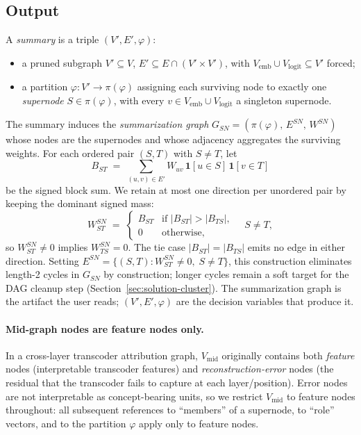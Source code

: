 \subsection{Output}\label{sec:output}

A \emph{summary} is a triple $(V', E', \varphi)$:
\begin{itemize}[leftmargin=*,topsep=2pt,itemsep=1pt]
\item a pruned subgraph $V' \subseteq V$, $E' \subseteq E \cap (V' \times V')$,
with $V_{\text{emb}} \cup V_{\text{logit}} \subseteq V'$ forced;
\item a partition $\varphi : V' \to \pi(\varphi)$ assigning each surviving
node to exactly one \emph{supernode} $S \in \pi(\varphi)$, with every
$v \in V_{\text{emb}} \cup V_{\text{logit}}$ a singleton supernode.
\end{itemize}
The summary induces the \emph{summarization graph}
$G_{SN} = (\pi(\varphi),\, E^{SN},\, W^{SN})$ whose nodes are the
supernodes and whose adjacency aggregates the surviving weights.
For each ordered pair $(S, T)$ with $S \ne T$, let
\begin{equation}
B_{ST} \;=\; \sum_{(u, v) \in E'} W_{uv}\,
\mathbf{1}[u \in S]\,\mathbf{1}[v \in T]
\label{eq:block-sum}
\end{equation}
be the signed block sum. We retain at most one direction per
unordered pair by keeping the dominant signed mass:
\begin{equation}
W^{SN}_{ST} \;=\;
\begin{cases}
B_{ST} & \text{if } |B_{ST}| > |B_{TS}|, \\
0      & \text{otherwise},
\end{cases}
\quad S \ne T,
\label{eq:wsn}
\end{equation}
so $W^{SN}_{ST} \ne 0$ implies $W^{SN}_{TS} = 0$. The tie case
$|B_{ST}| = |B_{TS}|$ emits no edge in either direction. Setting
$E^{SN} = \{(S, T) : W^{SN}_{ST} \ne 0,\; S \ne T\}$, this construction
eliminates length-2 cycles in $G_{SN}$ by construction; longer cycles
remain a soft target for the DAG cleanup step
(Section~\ref{sec:solution-cluster}). The summarization graph is the
artifact the user reads; $(V', E', \varphi)$ are the decision variables
that produce it.

\paragraph{Mid-graph nodes are feature nodes only.}
In a cross-layer transcoder attribution graph, $V_{\text{mid}}$
originally contains both \emph{feature} nodes (interpretable transcoder
features) and \emph{reconstruction-error} nodes (the residual that the
transcoder fails to capture at each layer/position). Error nodes are not
interpretable as concept-bearing units, so we restrict $V_{\text{mid}}$
to feature nodes throughout: all subsequent references to ``members''
of a supernode, to ``role'' vectors, and to the partition $\varphi$
apply only to feature nodes.

